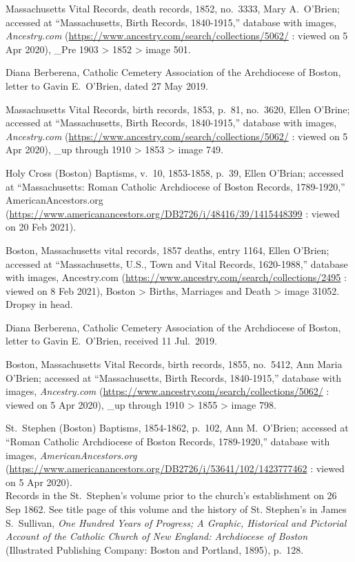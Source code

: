 \begin{thebibliography}{999}
Massachusetts Vital Records, death records, 1852, no.\ 3333, Mary A.\ O'Brien; accessed at ``Massachusetts, Birth Records, 1840-1915,'' database with images, \textit{Ancestry.com} (\url{https://www.ancestry.com/search/collections/5062/} : viewed on 5 Apr 2020), \_Pre 1903 > 1852 > image 501.

Diana Berberena, Catholic Cemetery Association of the Archdiocese of Boston, letter to Gavin E.\ O'Brien, dated 27 May 2019.

Massachusetts Vital Records, birth records, 1853, p.\ 81, no.\ 3620, Ellen O'Brine; accessed at ``Massachusetts, Birth Records, 1840-1915,'' database with images, \textit{Ancestry.com} (\url{https://www.ancestry.com/search/collections/5062/} : viewed on 5 Apr 2020), \_up through 1910 > 1853 > image 749.

Holy Cross (Boston) Baptisms, v.\ 10, 1853-1858, p.\ 39, Ellen O'Brian; accessed at ``Massachusetts: Roman Catholic Archdiocese of Boston Records, 1789-1920,'' AmericanAncestors.org (\url{https://www.americanancestors.org/DB2726/i/48416/39/1415448399} : viewed on 20 Feb 2021).

Boston, Massachusetts vital records, 1857 deaths, entry 1164, Ellen O'Brien; accessed at ``Massachusetts, U.S., Town and Vital Records, 1620-1988,'' database with images, Ancestry.com (\url{https://www.ancestry.com/search/collections/2495} : viewed on 8 Feb 2021), Boston > Births, Marriages and Death > image 31052.\\
Dropsy in head.

Diana Berberena, Catholic Cemetery Association of the Archdiocese of Boston, letter to Gavin E.\ O'Brien, received 11 Jul.\ 2019.

Boston, Massachusetts Vital Records, birth records, 1855, no.\ 5412, Ann Maria O'Brien; accessed at ``Massachusetts, Birth Records, 1840-1915,'' database with images, \textit{Ancestry.com} (\url{https://www.ancestry.com/search/collections/5062/} : viewed on 5 Apr 2020), \_up through 1910 > 1855 > image 798.

St.\ Stephen (Boston) Baptisms, 1854-1862, p.\ 102, Ann M.\ O'Brien; accessed at ``Roman Catholic Archdiocese of Boston Records, 1789-1920,'' database with images, \textit{AmericanAncestors.org} (\url{https://www.americanancestors.org/DB2726/i/53641/102/1423777462} : viewed on 5 Apr 2020).\\
Records in the St.\ Stephen's volume prior to the church's establishment on 26 Sep 1862. See title page of this volume and the history of St. Stephen's in James S.\ Sullivan, \textit{One Hundred Years of Progress; A Graphic, Historical and Pictorial Account of the Catholic Church of New England: Archdiocese of Boston} (Illustrated Publishing Company: Boston and Portland, 1895), p.\ 128.


\end{thebibliography}
